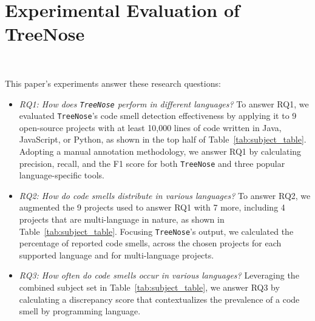 \section{Experimental Evaluation of TreeNose}~\label{sec:evaluation}

\vspace*{-1em}


\noindent
This paper's experiments answer these research questions:

\begin{itemize}[leftmargin=*]

    \item {\it RQ1: How does \texttt{TreeNose} perform in different languages?}
        To answer RQ1, we evaluated \texttt{TreeNose}'s code smell detection
        effectiveness by applying it to 9 open-source projects with at least
        10,000 lines of code written in Java, JavaScript, or Python, as shown in
        the top half of Table~\ref{tab:subject_table}. Adopting a manual
        annotation methodology, we answer RQ1 by calculating precision, recall,
        and the F1 score for both \texttt{TreeNose} and three popular
        language-specific tools.

    \item {\it RQ2: How do code smells distribute in various languages?} To
        answer RQ2, we augmented the 9 projects used to answer RQ1 with 7 more,
        including 4 projects that are multi-language in nature, as shown in
        Table~\ref{tab:subject_table}. Focusing \texttt{TreeNose}'s output, we
        calculated the percentage of reported code smells, across the chosen
        projects for each supported language and for multi-language projects.

    \item {\it RQ3: How often do code smells occur in various languages?}
        Leveraging the combined subject set in Table~\ref{tab:subject_table},
        we answer RQ3 by calculating a discrepancy score that contextualizes the
        prevalence of a code smell by programming language.

\end{itemize}


